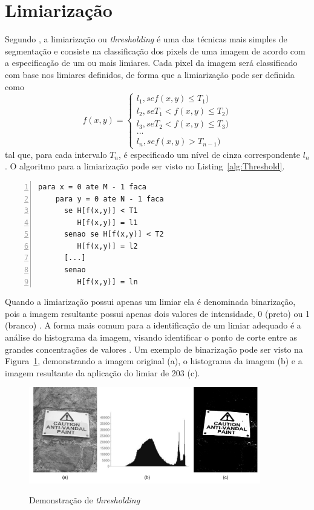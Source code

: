 \documentclass[12pt,oneside,a4paper,english,french,spanish,brazil,]{abntex2}
\begin{document}
\section{Limiarização}

Segundo \citet{pedrini:2008}, a limiarização ou \textit{thresholding} é uma das técnicas mais simples de segmentação e consiste na classificação dos pixels de uma imagem de acordo com a especificação de um ou mais limiares. Cada pixel da imagem será classificado com base nos limiares definidos, de forma que a limiarização pode ser definida como \[f(x,y)=\left\{\begin{matrix} l_1, se f(x,y) \leq T_1) \\ l_2, se T_1 < f(x,y) \leq T_2)\\ l_3, se T_2 < f(x,y) \leq T_3)\\ ...\\ l_n, se f(x,y) > T_{n-1}) \end{matrix}\right.\] tal que, para cada intervalo \(T_n\), é especificado um nível de cinza correspondente \(l_n\). O algoritmo para a limiarização pode ser visto no Listing~\ref{alg:Threshold}.

\begin{minipage}{\linewidth}
\begin{lstlisting}[caption={Algoritmo para limiarização}, label=alg:Threshold, numbers=left]
para x = 0 ate M - 1 faca
    para y = 0 ate N - 1 faca
      se H[f(x,y)] < T1
         H[f(x,y)] = l1
      senao se H[f(x,y)] < T2
         H[f(x,y)] = l2
      [...]
      senao 
         H[f(x,y)] = ln
\end{lstlisting}
\end{minipage}

Quando a limiarização possui apenas um limiar ela é denominada binarização, pois a imagem resultante possui apenas dois valores de intensidade, 0 (preto) ou 1 (branco) \cite{pedrini:2008}. A forma mais comum para a identificação de um limiar adequado é a análise do histograma da imagem, visando identificar o ponto de corte entre as grandes concentrações de valores \cite{gonzalez:2012}. Um exemplo de binarização pode ser visto na Figura~\ref{fig:PDI_Limiarizacao}, demonstrando a imagem original (a), o histograma da imagem (b) e a imagem resultante da aplicação do limiar de  203 (c).

\begin{figure}[ht]
\centering
\caption{ Demonstração de \textit{thresholding}}
\includegraphics[width=0.9\textwidth]{imagens/PDI_Limiarizacao.pdf}
\sourceAuthor
\label{fig:PDI_Limiarizacao}
\end{figure}
\end{document}
